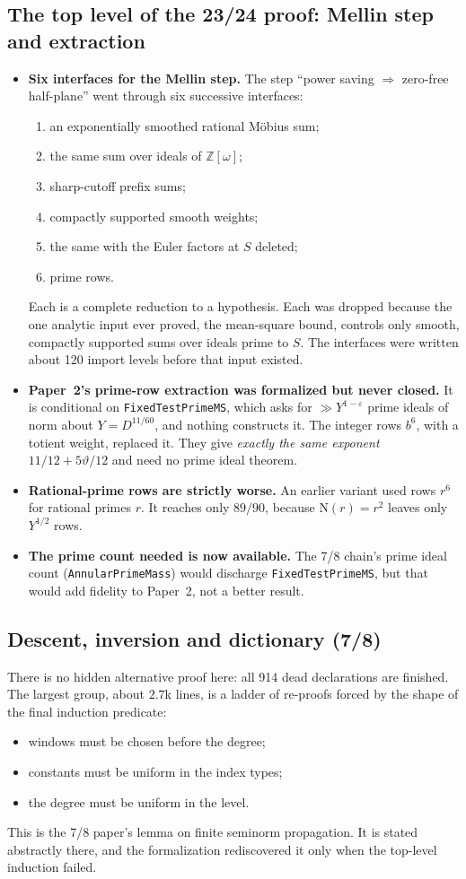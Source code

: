 \documentclass[11pt,a4paper]{article}
\newcommand{\lean}[1]{\nolinkurl{#1}}
\newcommand{\NK}{\mathrm N}
\begin{document}
\subsection{The top level of the 23/24 proof: Mellin step and extraction}
\begin{itemize}
\item \textbf{Six interfaces for the Mellin step.} The step ``power saving $\Rightarrow$ zero-free
half-plane'' went through six successive interfaces:
\begin{enumerate}
\item an exponentially smoothed rational M\"obius sum;
\item the same sum over ideals of $\mathbb Z[\omega]$;
\item sharp-cutoff prefix sums;
\item compactly supported smooth weights;
\item the same with the Euler factors at $S$ deleted;
\item prime rows.
\end{enumerate}
Each is a complete reduction to a hypothesis. Each was dropped because the one analytic input ever
proved, the mean-square bound, controls only smooth, compactly supported sums over ideals prime to
$S$. The interfaces were written about 120 import levels before that input existed.
\item \textbf{Paper~2's prime-row extraction was formalized but never closed.} It is conditional on
\lean{FixedTestPrimeMS}, which asks for $\gg Y^{1-\varepsilon}$ prime ideals of norm about
$Y=D^{11/60}$, and nothing constructs it. The integer rows $b^6$, with a totient weight, replaced
it. They give \emph{exactly the same exponent} $11/12+5\vartheta/12$ and need no prime ideal
theorem.
\item \textbf{Rational-prime rows are strictly worse.} An earlier variant used rows $r^6$ for
rational primes $r$. It reaches only $89/90$, because $\NK(r)=r^2$ leaves only $Y^{1/2}$ rows.
\item \textbf{The prime count needed is now available.} The 7/8 chain's prime ideal count
(\lean{AnnularPrimeMass}) would discharge \lean{FixedTestPrimeMS}, but that would add fidelity to
Paper~2, not a better result.
\end{itemize}

\subsection{Descent, inversion and dictionary (7/8)}
There is no hidden alternative proof here: all 914 dead declarations are finished. The largest group,
about $2.7$k lines, is a ladder of re-proofs forced by the shape of the final induction predicate:
\begin{itemize}
\item windows must be chosen before the degree;
\item constants must be uniform in the index types;
\item the degree must be uniform in the level.
\end{itemize}
This is the 7/8 paper's lemma on finite seminorm propagation. It is stated abstractly there, and the
formalization rediscovered it only when the top-level induction failed.
\end{document}
